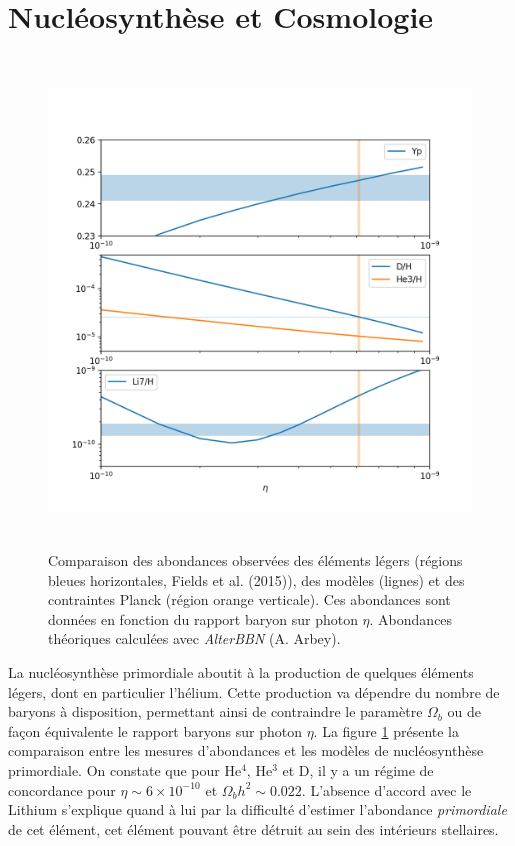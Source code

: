 \section{Nucléosynthèse et Cosmologie}

\begin{figure}[htbp]
	\centering
		\includegraphics[height=13cm]{figs/BBN.png}
		\caption{Comparaison des abondances observées des éléments légers (régions bleues horizontales, Fields et al. (2015)), des modèles (lignes) et des contraintes Planck (région orange verticale). Ces abondances sont données en fonction du rapport baryon sur photon  $\eta$. Abondances théoriques calculées avec \textit{AlterBBN} (A. Arbey).}
	\label{f:nucle}
\end{figure}

La nucléosynthèse primordiale aboutit à la production de quelques éléments légers, dont en particulier l'hélium. Cette production va dépendre du nombre de baryons à disposition, permettant ainsi de contraindre le paramètre $\Omega_b$ ou de façon équivalente le rapport baryons sur photon $\eta$. La figure \ref{f:nucle} présente la comparaison entre les mesures d'abondances et les modèles de nucléosynthèse primordiale. On constate que pour He$^4$, He$^3$ et D, il y a un régime de concordance pour $\eta \sim 6\times 10^{-10}$ et $\Omega_b h^2\sim 0.022$. L'absence d'accord avec le Lithium s'explique quand à lui par la difficulté d'estimer l'abondance \textit{primordiale} de cet élément, cet élément pouvant être détruit au sein des intérieurs stellaires.

